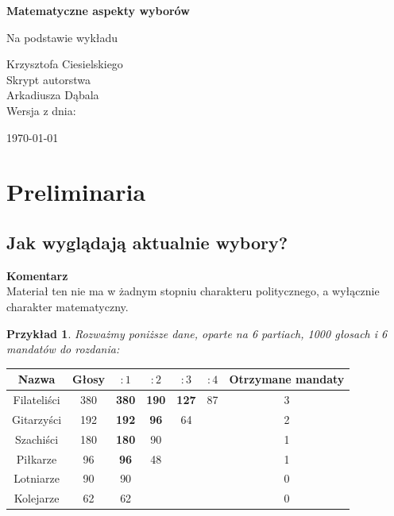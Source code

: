 \documentclass[12pt,a4paper]{article}
\theoremstyle{break}
\newcommand{\Komentarz}[1]{
	\begin{mdframed}[style=zadanie]
		\textbf{Komentarz}\\
		#1
	\end{mdframed}
	}
\newtheorem{example}{Przykład}[section]
\begin{document}
	
	\begin{titlepage}
		\centering
		\vspace{1cm}
		{\Huge\bfseries Matematyczne aspekty wyborów \par} 
		\vspace{1.5cm}
		{\large Na podstawie wykładu \par} 
		\vspace{0.5cm}
		{\Large Krzysztofa Ciesielskiego}\\
		\vspace{1cm}
		{\large Skrypt autorstwa}\\
		\vspace{0.5cm}
		{\Large Arkadiusza Dąbala}\\
		\vfill 
		{\large Wersja z dnia:}\\
		{\Large \today \par}  
		\vspace*{1cm}
	\end{titlepage}
	\newpage
	\tableofcontents
	\newpage
\section{Preliminaria}
\subsection{Jak wyglądają aktualnie wybory?}
\Komentarz{Materiał ten nie ma w żadnym stopniu charakteru politycznego, a wyłącznie charakter matematyczny.}

\begin{example}
Rozważmy poniższe dane, oparte na 6 partiach, 1000 głosach i 6 mandatów do rozdania:
\end{example}

\begin{tabular}{|c|c|c|c|c|c|c|}\hline
	Nazwa        & Głosy & $:1$ & $:2$ & $:3$ & $:4$ & Otrzymane mandaty\\\hline
	Filateliści  & 380   & \textbf{380} & \textbf{190} & \textbf{127} & 87   & 3\\\hline
	Gitarzyści   & 192   & \textbf{192} & \textbf{96}  & 64   &       & 2\\\hline
	Szachiści    & 180   & \textbf{180} & 90    &       &       & 1\\\hline
	Piłkarze     & 96    & \textbf{96}  & 48    &       &       & 1\\\hline
	Lotniarze    & 90    & 90    &       &       &       & 0\\\hline
	Kolejarze    & 62    & 62    &       &       &       & 0\\\hline
\end{tabular}\\
\end{document}
